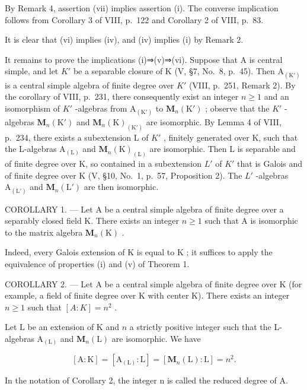 By Remark 4, assertion (vii) implies assertion (i). The converse implication follows from Corollary 3 of VIII, p.~122 and Corollary 2 of VIII, p.~83.

It is clear that (vi) implies (iv), and (iv) implies (i) by Remark 2.

It remains to prove the implications (i)⇒(v)⇒(vi). Suppose that A is central simple, and let \(K'\) be a separable closure of K (V, §7, No.~8, p.~45). Then \(\mathrm{A}_{(\mathrm{K}')}\) is a central simple algebra of finite degree over \(K'\) (VIII, p.~251, Remark 2). By the corollary of VIII, p.~231, there consequently exist an integer \(n \geqslant 1\) and an isomorphism of \(K'\) -algebras from \(\mathrm{A}_{(\mathrm{K}')}\) to \(\mathbf{M}_{n}(\mathrm{K}')\) ; observe that the \(K'\) -algebras \(\mathbf{M}_{n}(\mathrm{K}')\) and \(\mathbf{M}_{n}(\mathrm{K})_{(\mathrm{K}')}\) are isomorphic. By Lemma 4 of VIII, p.~234, there exists a subextension L of \(K'\) , finitely generated over K, such that the L-algebras \(\mathrm{A}_{(\mathrm{L})}\) and \(\mathbf{M}_{n}(\mathrm{K})_{(\mathrm{L})}\) are isomorphic. Then L is separable and of finite degree over K, so contained in a subextension \(L'\) of \(K'\) that is Galois and of finite degree over K (V, §10, No.~1, p.~57, Proposition 2). The \(L'\) -algebras \(\mathrm{A}_{(\mathrm{L}')}\) and \(\mathbf{M}_{n}(\mathrm{L}')\) are then isomorphic.

COROLLARY 1. --- Let A be a central simple algebra of finite degree over a separably closed field K. There exists an integer \(n \geqslant 1\) such that A is isomorphic to the matrix algebra \(\mathbf{M}_{n}(\mathrm{K})\) .

Indeed, every Galois extension of \(\mathrm{K}\) is equal to \(\mathrm{K}\) ; it suffices to apply the equivalence of properties (i) and (v) of Theorem 1.

COROLLARY 2. --- Let A be a central simple algebra of finite degree over K (for example, a field of finite degree over K with center K). There exists an integer \(n \geqslant 1\) such that \([A : K] = n^{2}\) .

Let \(\mathrm{L}\) be an extension of \(\mathrm{K}\) and \(n\) a strictly positive integer such that the L-algebras \(\mathrm{A}_{(\mathrm{L})}\) and \(\mathbf{M}_n(\mathrm{L})\) are isomorphic. We have

\[
[ \mathrm{A}: \mathrm{K} ] = [ \mathrm{A} _ {(\mathrm{L})}: \mathrm{L} ] = [ \mathbf {M} _ {n} (\mathrm{L}): \mathrm{L} ] = n ^ {2}.
\]

In the notation of Corollary 2, the integer n is called the reduced degree of A.

